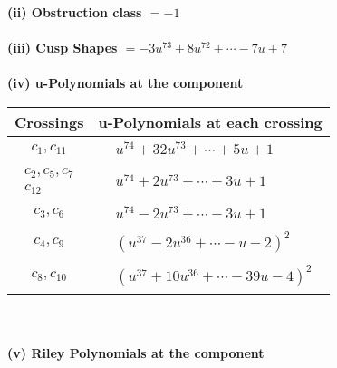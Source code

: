 \documentclass[1p]{elsarticle_modified}
\theoremstyle{definition}
\begin{document}
\flushleft \textbf{(ii) Obstruction class $= -1$}\\~\\
\flushleft \textbf{(iii) Cusp Shapes $= -3 u^{73}+8 u^{72}+\cdots-7 u+7$}\\~\\
\newpage\renewcommand{\arraystretch}{1}
\flushleft \textbf{(iv) u-Polynomials at the component}\newline \\
\begin{tabular}{m{50pt}|m{274pt}}
Crossings & \hspace{64pt}u-Polynomials at each crossing \\
\hline $$\begin{aligned}c_{1},c_{11}\end{aligned}$$&$\begin{aligned}
&u^{74}+32 u^{73}+\cdots+5 u+1
\end{aligned}$\\
\hline $$\begin{aligned}c_{2},c_{5},c_{7}\\c_{12}\end{aligned}$$&$\begin{aligned}
&u^{74}+2 u^{73}+\cdots+3 u+1
\end{aligned}$\\
\hline $$\begin{aligned}c_{3},c_{6}\end{aligned}$$&$\begin{aligned}
&u^{74}-2 u^{73}+\cdots-3 u+1
\end{aligned}$\\
\hline $$\begin{aligned}c_{4},c_{9}\end{aligned}$$&$\begin{aligned}
&(u^{37}-2 u^{36}+\cdots- u-2)^{2}
\end{aligned}$\\
\hline $$\begin{aligned}c_{8},c_{10}\end{aligned}$$&$\begin{aligned}
&(u^{37}+10 u^{36}+\cdots-39 u-4)^{2}
\end{aligned}$\\
\hline
\end{tabular}\\~\\
\newpage\renewcommand{\arraystretch}{1}
\flushleft \textbf{(v) Riley Polynomials at the component}\newline \\
\end{document}
